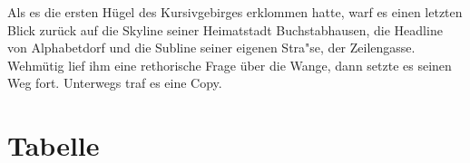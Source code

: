 \documentclass[../thesis.tex]{subfiles}
\begin{document}
\noindent Als es die ersten Hügel des Kursivgebirges erklommen hatte, warf es einen letzten Blick zurück auf die Skyline seiner Heimatstadt Buchstabhausen, die Headline von Alphabetdorf und die Subline seiner eigenen Stra"se, der Zeilengasse. Wehmütig lief ihm eine rethorische Frage über die Wange, dann setzte es seinen Weg fort. Unterwegs traf es eine Copy.




%
%
%
%
%
%
%
%
%
%
%
%
%
%
%
%
%

\section{Tabelle}
\end{document}
